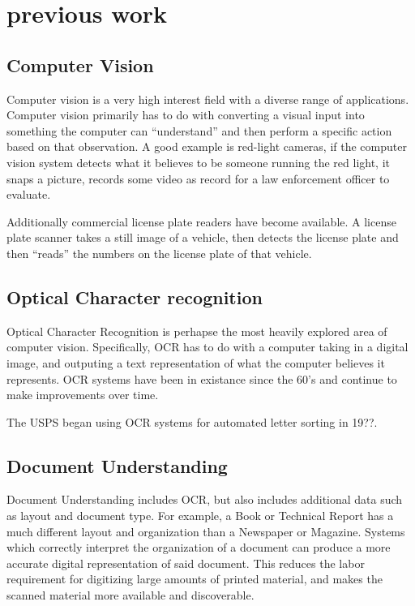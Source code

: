 \chapter{previous work}
\section{Computer Vision}

Computer vision is a very high interest field with a diverse range of applications.  Computer vision primarily has to do with converting a visual input into something the computer can ``understand'' and then perform a specific action based on that observation.  A good example is red-light cameras, if the computer vision system detects what it believes to be someone running the red light, it snaps a picture, records some video as record for a law enforcement officer to evaluate.

Additionally commercial license plate readers have become available.  A license plate scanner takes a still image of a vehicle, then detects the license plate and then ``reads'' the numbers on the license plate of that vehicle.


\section{Optical Character recognition}

Optical Character Recognition is perhapse the most heavily explored area of computer vision.  Specifically, OCR has to do with a computer taking in a digital image, and outputing a text representation of what the computer believes it represents.  OCR systems have been in existance since the 60's and continue to make improvements over time.

The USPS began using OCR systems for automated letter sorting in 19??. 

\section{Document Understanding}

Document Understanding includes OCR, but also includes additional data such as layout and document type.  For example, a Book or Technical Report has a much different layout and organization than a Newspaper or Magazine.  Systems which correctly interpret the organization of a document can produce a more accurate digital representation of said document.  This reduces the labor requirement for digitizing large amounts of printed material, and makes the scanned material more available and discoverable.

